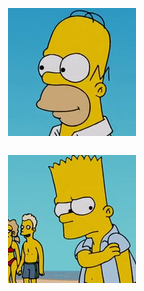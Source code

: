 \documentclass[11pt,francais]{article}
\begin{document}
\begin{figure}[!h]
    \centering
    \begin{subfigure}[b]{0.19\textwidth}
        \includegraphics[width=\textwidth]{Figures/Simpsons_Dataset/13.png}
    \end{subfigure}
    \begin{subfigure}[b]{0.19\textwidth}
        \includegraphics[width=\textwidth]{Figures/Simpsons_Dataset/15.png}

\end{subfigure}
\end{figure}
\end{document}
